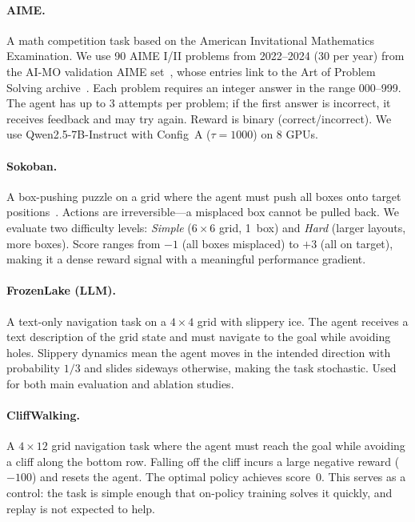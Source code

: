 \documentclass[runningheads]{llncs}
\begin{document}
\paragraph{AIME.}
A math competition task based on the American Invitational Mathematics Examination. We use 90 AIME I/II problems from 2022--2024 (30 per year) from the AI-MO validation AIME set~\cite{aimoValidationAime}, whose entries link to the Art of Problem Solving archive~\cite{aopsAimeArchive}. Each problem requires an integer answer in the range 000--999. The agent has up to 3 attempts per problem; if the first answer is incorrect, it receives feedback and may try again. Reward is binary (correct/incorrect). We use Qwen2.5-7B-Instruct with Config~A ($\tau{=}1000$) on 8 GPUs.

\paragraph{Sokoban.}
A box-pushing puzzle on a grid where the agent must push all boxes onto target positions~\cite{wang2025roll}. Actions are irreversible---a misplaced box cannot be pulled back. We evaluate two difficulty levels: \emph{Simple} ($6{\times}6$ grid, 1~box) and \emph{Hard} (larger layouts, more boxes). Score ranges from $-1$ (all boxes misplaced) to $+3$ (all on target), making it a dense reward signal with a meaningful performance gradient.

\paragraph{FrozenLake (LLM).}
A text-only navigation task on a $4{\times}4$ grid with slippery ice. The agent receives a text description of the grid state and must navigate to the goal while avoiding holes. Slippery dynamics mean the agent moves in the intended direction with probability $1/3$ and slides sideways otherwise, making the task stochastic. Used for both main evaluation and ablation studies.

\paragraph{CliffWalking.}
A $4{\times}12$ grid navigation task where the agent must reach the goal while avoiding a cliff along the bottom row. Falling off the cliff incurs a large negative reward ($-100$) and resets the agent. The optimal policy achieves score~0. This serves as a control: the task is simple enough that on-policy training solves it quickly, and replay is not expected to help.
\end{document}
